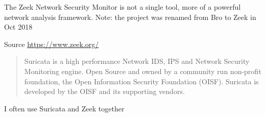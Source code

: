 \documentclass[Screen16to9,17pt]{foils}
\begin{document}

The Zeek Network Security Monitor is not a single tool, more of a
powerful network analysis framework. Note: the project was renamed from Bro to Zeek in Oct 2018

{\small Source \url{https://www.zeek.org/}}




\begin{quote}
Suricata is a high performance Network IDS, IPS and Network Security Monitoring engine. Open Source and owned by a community run non-profit foundation, the Open Information Security Foundation (OISF). Suricata is developed by the OISF and its supporting vendors.
\end{quote}


\centerline{I often use Suricata and Zeek together}
\end{document}

